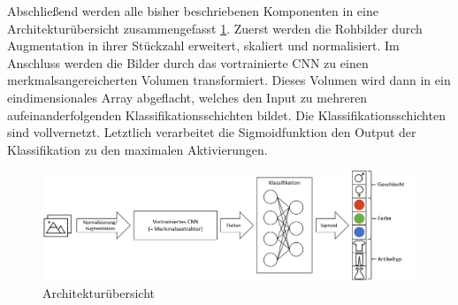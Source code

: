 Abschließend werden alle bisher beschriebenen Komponenten in eine Architekturübersicht zusammengefasst \ref{fig:generalArch}. Zuerst werden die Rohbilder durch Augmentation in ihrer Stückzahl erweitert, skaliert und normalisiert. Im Anschluss werden die Bilder durch das vortrainierte CNN zu einen merkmalsangereicherten Volumen transformiert. Dieses Volumen wird dann in ein eindimensionales Array abgeflacht, welches den Input zu mehreren aufeinanderfolgenden Klassifikationsschichten bildet. Die Klassifikationsschichten sind vollvernetzt. Letztlich verarbeitet die Sigmoidfunktion den Output der Klassifikation zu den maximalen Aktivierungen.
\begin{figure}[H]
	\centering
	\includegraphics[width=0.9\linewidth]{images/general_architecture.png}
	\caption{Architekturübersicht}
	\label{fig:generalArch}
\end{figure}

